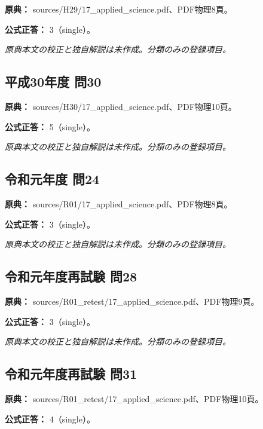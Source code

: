\noindent\textbf{原典：} sources/H29/17\_applied\_science.pdf、PDF物理8頁。

\textbf{公式正答：} 3（single）。

\par\textit{原典本文の校正と独自解説は未作成。分類のみの登録項目。}

\subsection{平成30年度 問30}
\label{q:h30-reg-applied-30}

\noindent\textbf{原典：} sources/H30/17\_applied\_science.pdf、PDF物理10頁。

\textbf{公式正答：} 5（single）。

\par\textit{原典本文の校正と独自解説は未作成。分類のみの登録項目。}

\subsection{令和元年度 問24}
\label{q:r01-reg-applied-24}

\noindent\textbf{原典：} sources/R01/17\_applied\_science.pdf、PDF物理8頁。

\textbf{公式正答：} 3（single）。

\par\textit{原典本文の校正と独自解説は未作成。分類のみの登録項目。}

\subsection{令和元年度再試験 問28}
\label{q:r01-ret-applied-28}

\noindent\textbf{原典：} sources/R01\_retest/17\_applied\_science.pdf、PDF物理9頁。

\textbf{公式正答：} 3（single）。

\par\textit{原典本文の校正と独自解説は未作成。分類のみの登録項目。}

\subsection{令和元年度再試験 問31}
\label{q:r01-ret-applied-31}

\noindent\textbf{原典：} sources/R01\_retest/17\_applied\_science.pdf、PDF物理10頁。

\textbf{公式正答：} 4（single）。

